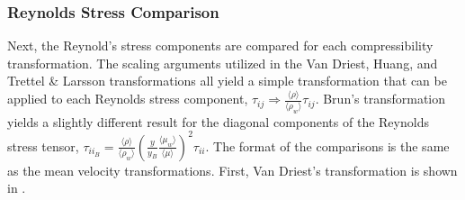 \documentclass[12pt,a4paper,titlepage]{article}
\begin{document}
\subsubsection{Reynolds Stress Comparison}
Next, the Reynold's stress components are compared for each compressibility transformation. The scaling arguments utilized in the Van Driest, Huang, and Trettel \& Larsson transformations all yield a simple transformation that can be applied to each Reynolds stress component, $\tau_{ij} \Rightarrow \frac{\langle \rho \rangle}{\langle \rho_w \rangle}\tau_{ij}$. Brun's transformation yields a slightly different result for the diagonal components of the Reynolds stress tensor, $\tau_{{ii}_B} = \frac{\langle \rho \rangle}{\langle \rho_w \rangle}(\frac{y}{y_B}\frac{\langle \mu_w \rangle}{\langle \mu \rangle})^2 \tau_{ii}$. The format of the comparisons is the same as the mean velocity transformations. First, Van Driest's transformation is shown in . 
\end{document}
